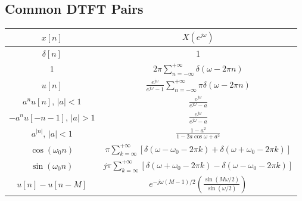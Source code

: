 \subsection{Common DTFT Pairs}
\begin{table}[H]
    \centering
    \begin{tabular}{c c}
    \toprule
    $x[n]$    & $X(e^{j\omega})$ \\ 
    \midrule
        $\delta[n]$     &   1  \\[.5em]
        
        1   &   $2\pi \sum_{n=-\infty}^{+\infty} \delta(\omega-2\pi n)$ \\[.5em]
        
        $u[n]$  &   $\frac{e^{j\omega}}{e^{j\omega}-1} \sum_{n=-\infty}^{+\infty} \pi \delta(\omega-2\pi n)$ \\[.5em]
        
        $a^n u[n]$, $\lvert a \rvert <1$    &   $\frac{e^{j\omega}}{e^{j\omega}-a}$ \\[.5em]

        $-a^n u[-n-1]$, $\lvert a \rvert >1$    &   $\frac{e^{j\omega}}{e^{j\omega}-a}$ \\[.5em]

        $a^{\lvert n \rvert}$, $\lvert a \rvert <1$     &   $\frac{1-a^2}{1-2a\cos\omega+a^2}$ \\[.5em]

        $\cos(\omega_0 n)$    &   $\pi \sum_{k=\infty}^{+\infty} [\delta(\omega -\omega_0 - 2\pi k) + \delta(\omega +\omega_0 - 2\pi k)]$ \\[.5em]

        $\sin(\omega_0 n)$    &   $j\pi \sum_{k=\infty}^{+\infty} [\delta(\omega + \omega_0 - 2\pi k) - \delta(\omega - \omega_0 - 2\pi k)]$ \\[.5em]

        $u[n] - u[n-M]$ &   $e^{-j\omega(M-1)/2} (\frac{\sin(M\omega/2)}{\sin(\omega/2)})$\\[.5em]
    \bottomrule
    \end{tabular}
\end{table}

